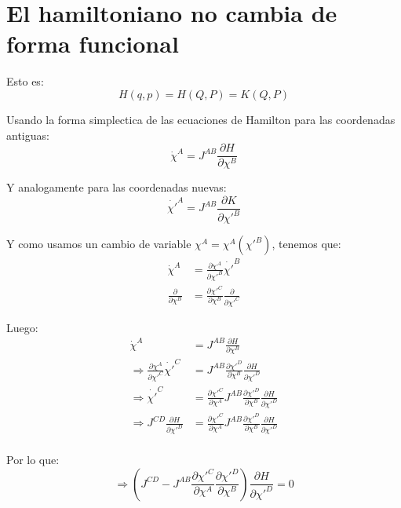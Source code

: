 \documentclass[12pt]{report}
\begin{document}
\section{El hamiltoniano no cambia de forma funcional}

Esto es:
	\begin{equation*}
		H(q,p) = H(Q,P) = K(Q,P)
	\end{equation*}

Usando la forma simplectica de las ecuaciones de Hamilton para las coordenadas antiguas:
	\begin{equation*}
		\dot{\chi}^{A} = J^{AB}\frac{\partial H}{\partial \chi^{B}}
	\end{equation*}

Y analogamente para las coordenadas nuevas:
	\begin{equation*}
		\dot{\chi'}^{A} = J^{AB}\frac{\partial K}{\partial \chi'^{B}}
	\end{equation*}
	
Y como usamos un cambio de variable $ \chi^{A} = \chi^{A} (\chi'^{B}) $, tenemos que:
	\begin{align*}
		\dot{\chi}^{A} &= \frac{\partial \chi^{A}}{\partial \chi'^{B}} \dot{\chi'}^{B} \\
		\frac{\partial }{\partial \chi^{B}} &= \frac{\partial \chi'^{C}}{\partial \chi^{B}} \frac{\partial }{\partial \chi'^{C}}
	\end{align*}
	
Luego:
	\begin{align*}
		\dot{\chi}^{A} &= J^{AB}\frac{\partial H}{\partial \chi^{B}}  \\
\Rightarrow \frac{\partial \chi^{A}}{\partial \chi'^{C}} \dot{\chi'}^{C} &= 
             J^{AB}\frac{\partial \chi'^{D}}{\partial \chi^{B}} \frac{\partial H}{\partial \chi'^{D}} \\
\Rightarrow  \dot{\chi'}^{C} &=  
             \frac{\partial \chi'^{C}}{\partial \chi^{A}}J^{AB}\frac{\partial \chi'^{D}}{\partial \chi^{B}} \frac{\partial H}{\partial \chi'^{D}} \\   
\Rightarrow J^{CD}\frac{\partial H}{\partial \chi'^{D}} &=  
             \frac{\partial \chi'^{C}}{\partial \chi^{A}}J^{AB}\frac{\partial \chi'^{D}}{\partial \chi^{B}} \frac{\partial H}{\partial \chi'^{D}} \\   
	\end{align*}
	
Por lo que:
	\begin{equation*}
\Rightarrow \left(J^{CD} - J^{AB}\frac{\partial \chi'^{C}}{\partial \chi^{A}}\frac{\partial \chi'^{D}}{\partial \chi^{B}}\right)\frac{\partial H}{\partial \chi'^{D}} = 0
	\end{equation*}
\end{document}
